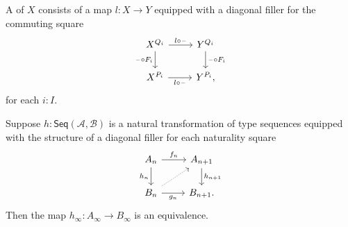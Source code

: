 \begin{defn}
A  of $X$ consists of a map $l:X\to Y$ equipped with a diagonal filler for the commuting square
\begin{equation*}
\begin{tikzcd}
X^{Q_i} \arrow[r,"l\circ\blank"] \arrow[d,swap,"\blank\circ F_i"] & Y^{Q_i} \arrow[d,"\blank\circ F_i"] \\
X^{P_i} \arrow[r,swap,"l\circ \blank"] & Y^{P_i},
\end{tikzcd}
\end{equation*}
for each $i:I$.
\end{defn}

\begin{lem}
Suppose $h:\mathsf{Seq}(\mathcal{A},\mathcal{B})$ is a natural transformation of type sequences equipped with the structure of a diagonal filler for each naturality square
\begin{equation*}
\begin{tikzcd}
A_n \arrow[r,"f_n"] \arrow[d,swap,"h_n"] & A_{n+1} \arrow[d,"h_{n+1}"] \\
B_n \arrow[r,swap,"g_n"] \arrow[ur,densely dotted] & B_{n+1}.
\end{tikzcd}
\end{equation*}
Then the map $h_\infty : A_\infty\to B_\infty$ is an equivalence. 
\end{lem}

